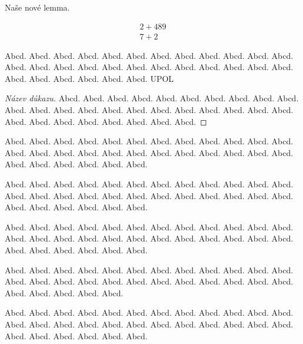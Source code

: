 \documentclass[
  master=false                %
  font=sans,                  %
  printversion=false,         %
  joinlists=true,             %
  glossaries=true,            %
  figures=true,               %
  tables=true,                %
  sourcecodes=true,					  %
  theorems=true,						  %
  bibencoding=utf8,           %
  language=czech,             %
  encoding=utf8,              %
  field=inf,                  %
  index=true,                 %
]{updiplom}
\begin{document}
\begin{lemma}
Naše nové lemma.
\end{lemma}

\begin{align}
2+489 \\
7+2
\end{align}


\begin{definition}
Abcd. Abcd. Abcd. Abcd. Abcd. Abcd. Abcd. Abcd. Abcd. Abcd. Abcd. Abcd. Abcd. Abcd. Abcd. Abcd. Abcd. Abcd. Abcd. Abcd. Abcd. Abcd. Abcd. Abcd. Abcd. Abcd. Abcd. Abcd. Abcd. Abcd. \gls{UPOL}
\end{definition}

\begin{proof}[Název důkazu]
Abcd. Abcd. Abcd. Abcd. Abcd. Abcd. Abcd. Abcd. Abcd. Abcd. Abcd. Abcd. Abcd. Abcd. Abcd. Abcd. Abcd. Abcd. Abcd. Abcd. Abcd. Abcd. Abcd. Abcd. Abcd. Abcd. Abcd. Abcd. Abcd. Abcd. 
\end{proof}

\begin{remark}
Abcd. Abcd. Abcd. Abcd. Abcd. Abcd. Abcd. Abcd. Abcd. Abcd. Abcd. Abcd. Abcd. Abcd. Abcd. Abcd. Abcd. Abcd. Abcd. Abcd. Abcd. Abcd. Abcd. Abcd. Abcd. Abcd. Abcd. Abcd. Abcd. Abcd. 
\end{remark}

\begin{example}
Abcd. Abcd. Abcd. Abcd. Abcd. Abcd. Abcd. Abcd. Abcd. Abcd. Abcd. Abcd. Abcd. Abcd. Abcd. Abcd. Abcd. Abcd. Abcd. Abcd. Abcd. Abcd. Abcd. Abcd. Abcd. Abcd. Abcd. Abcd. Abcd. Abcd. 
\end{example}

\begin{lemma}
Abcd. Abcd. Abcd. Abcd. Abcd. Abcd. Abcd. Abcd. Abcd. Abcd. Abcd. Abcd. Abcd. Abcd. Abcd. Abcd. Abcd. Abcd. Abcd. Abcd. Abcd. Abcd. Abcd. Abcd. Abcd. Abcd. Abcd. Abcd. Abcd. Abcd. 
\end{lemma}

\begin{consequence}
Abcd. Abcd. Abcd. Abcd. Abcd. Abcd. Abcd. Abcd. Abcd. Abcd. Abcd. Abcd. Abcd. Abcd. Abcd. Abcd. Abcd. Abcd. Abcd. Abcd. Abcd. Abcd. Abcd. Abcd. Abcd. Abcd. Abcd. Abcd. Abcd. 
\end{consequence}

\begin{theorem}
Abcd. Abcd. Abcd. Abcd. Abcd. Abcd. Abcd. Abcd. Abcd. Abcd. Abcd. Abcd. Abcd. Abcd. Abcd. Abcd. Abcd. Abcd. Abcd. Abcd. Abcd. Abcd. Abcd. Abcd. Abcd. Abcd. Abcd. Abcd. Abcd. Abcd. 
\end{theorem}
\end{document}
